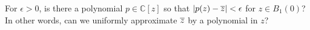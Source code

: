 \documentclass{homework}
\begin{document}
                                                                                                                                                                                                                                          \begin{problem}\label{uniformly-approximate-conj}For $\epsilon > 0$, is there a polynomial $p \in \mathbb{C}[z]$ so
                                                                                                                                                                                                                                            that $\left|p(z) - \overline{z}\right| < \epsilon$ for $z \in B_1(0)$?  In
                                                                                                                                                                                                                                              other words, can we uniformly approximate $\overline{z}$ by a polynomial
                                                                                                                                                                                                                                                in $z$?
                                                                                                                                                                                                                                                \end{problem}
\end{document}
